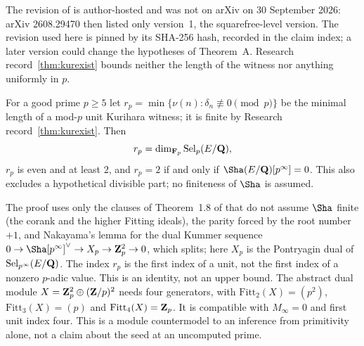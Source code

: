 The revision of \cite{clw} is author-hosted and was not on arXiv on 30 September 2026: arXiv 2608.29470 then listed only version~1, the squarefree-level version. The revision used here is pinned by its SHA-256 hash, recorded in the claim index; a later version could change the hypotheses of Theorem~A. Research record~\ref{thm:kurexist} bounds neither the length of the witness nor anything uniformly in $p$.

\begin{researchrecord}\label{thm:rp}
For a good prime $p\ge5$ let $r_p=\min\{\nu(n):\delta_n\not\equiv0\pmod p\}$ be the minimal length of a mod-$p$ unit Kurihara witness; it is finite by Research record~\ref{thm:kurexist}. Then
\[
r_p=\dim_{\mathbf{F}_p}\operatorname{Sel}_p(E/\mathbf{Q}),
\]
$r_p$ is even and at least $2$, and $r_p=2$ if and only if $\Sha(E/\Q)[p^\infty]=0$. This also excludes a hypothetical divisible part; no finiteness of $\Sha$ is assumed.
\end{researchrecord}
The proof uses only the clauses of Theorem~1.8 of \cite{kimch} that do not assume $\Sha$ finite (the corank and the higher Fitting ideals), the parity forced by the root number $+1$, and Nakayama's lemma for the dual Kummer sequence $0\to\Sha[p^\infty]^\vee\to X_p\to\Z_p^2\to0$, which splits; here $X_p$ is the Pontryagin dual of $\operatorname{Sel}_{p^\infty}(E/\mathbf{Q})$. The index $r_p$ is the first index of a unit, not the first index of a nonzero $p$-adic value. This is an identity, not an upper bound. The abstract dual module $X=\mathbf{Z}_p^2\oplus(\mathbf{Z}/p)^2$ needs four generators, with $\mathrm{Fitt}_2(X)=(p^2)$, $\mathrm{Fitt}_3(X)=(p)$ and $\mathrm{Fitt}_4(X)=\mathbf{Z}_p$. It is compatible with $M_\infty=0$ and first unit index four. This is a module countermodel to an inference from primitivity alone, not a claim about the seed at an uncomputed prime.

